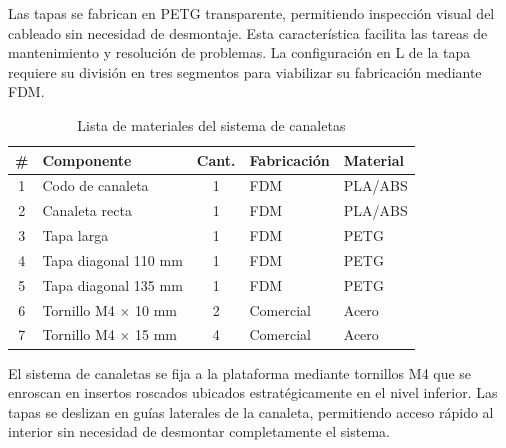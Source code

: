 Las tapas se fabrican en PETG transparente, permitiendo inspección visual del cableado sin necesidad de desmontaje. Esta característica facilita las tareas de mantenimiento y resolución de problemas. La configuración en L de la tapa requiere su división en tres segmentos para viabilizar su fabricación mediante FDM.

\begin{table}[H]
\centering
\caption{Lista de materiales del sistema de canaletas}
\label{tab:bom_canaleta}
\small
\begin{tabular}{|c|l|c|l|l|}
\hline
\textbf{\#} & \textbf{Componente} & \textbf{Cant.} & \textbf{Fabricación} & \textbf{Material} \\
\hline
1 & Codo de canaleta & 1 & FDM & PLA/ABS \\
2 & Canaleta recta & 1 & FDM & PLA/ABS \\
3 & Tapa larga & 1 & FDM & PETG \\
4 & Tapa diagonal 110 mm & 1 & FDM & PETG \\
5 & Tapa diagonal 135 mm & 1 & FDM & PETG \\
6 & Tornillo M4 × 10 mm & 2 & Comercial & Acero \\
7 & Tornillo M4 × 15 mm & 4 & Comercial & Acero \\
\hline
\end{tabular}
\end{table}

El sistema de canaletas se fija a la plataforma mediante tornillos M4 que se enroscan en insertos roscados ubicados estratégicamente en el nivel inferior. Las tapas se deslizan en guías laterales de la canaleta, permitiendo acceso rápido al interior sin necesidad de desmontar completamente el sistema.